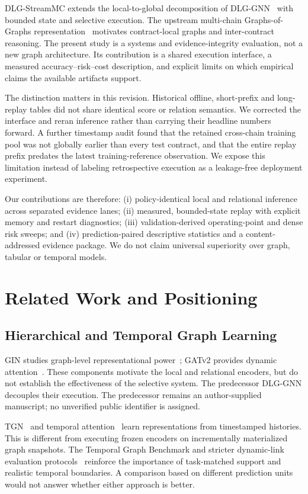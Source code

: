 \documentclass[10pt,journal]{IEEEtran}
\begin{document}
DLG-StreamMC extends the local-to-global decomposition of DLG-GNN~\cite{park2026decoupled} with bounded state and selective execution. The upstream multi-chain Graphs-of-Graphs representation~\cite{luo2024multichain} motivates contract-local graphs and inter-contract reasoning. The present study is a systems and evidence-integrity evaluation, not a new graph architecture. Its contribution is a shared execution interface, a measured accuracy--risk--cost description, and explicit limits on which empirical claims the available artifacts support.

The distinction matters in this revision. Historical offline, short-prefix and long-replay tables did not share identical score or relation semantics. We corrected the interface and reran inference rather than carrying their headline numbers forward. A further timestamp audit found that the retained cross-chain training pool was not globally earlier than every test contract, and that the entire replay prefix predates the latest training-reference observation. We expose this limitation instead of labeling retrospective execution as a leakage-free deployment experiment.

Our contributions are therefore: (i) policy-identical local and relational inference across separated evidence lanes; (ii) measured, bounded-state replay with explicit memory and restart diagnostics; (iii) validation-derived operating-point and dense risk sweeps; and (iv) prediction-paired descriptive statistics and a content-addressed evidence package. We do not claim universal superiority over graph, tabular or temporal models.

\section{Related Work and Positioning}
\subsection{Hierarchical and Temporal Graph Learning}
GIN studies graph-level representational power~\cite{xu2019gin}; GATv2 provides dynamic attention~\cite{brody2022how}. These components motivate the local and relational encoders, but do not establish the effectiveness of the selective system. The predecessor DLG-GNN decouples their execution. The predecessor remains an author-supplied manuscript; no unverified public identifier is assigned.

TGN~\cite{rossi2020temporal} and temporal attention~\cite{xu2020tgat} learn representations from timestamped histories. This is different from executing frozen encoders on incrementally materialized graph snapshots. The Temporal Graph Benchmark and stricter dynamic-link evaluation protocols~\cite{huang2023tgb,poursafaei2022evaluation} reinforce the importance of task-matched support and realistic temporal boundaries. A comparison based on different prediction units would not answer whether either approach is better.
\end{document}
